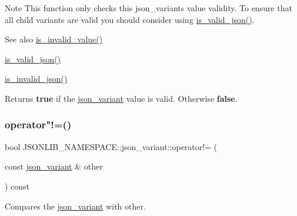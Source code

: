 \begin{DoxyNote}{Note}
This function only checks this json\+\_\+variants value validity. To ensure that all child variants are valid you should consider using \hyperlink{classJSONLIB__NAMESPACE_1_1json__variant_a158e3148d9256af3d1b8251b2ca7b6c4}{is\+\_\+valid\+\_\+json()}. 
\end{DoxyNote}
\begin{DoxySeeAlso}{See also}
\hyperlink{classJSONLIB__NAMESPACE_1_1json__variant_ab6552a5e3de90ab1fbca078e5c245bfb}{is\+\_\+invalid\+\_\+value()} 

\hyperlink{classJSONLIB__NAMESPACE_1_1json__variant_a158e3148d9256af3d1b8251b2ca7b6c4}{is\+\_\+valid\+\_\+json()} 

\hyperlink{classJSONLIB__NAMESPACE_1_1json__variant_a1a08b35da4cf3a334d32ebb81b20c08a}{is\+\_\+invalid\+\_\+json()} 
\end{DoxySeeAlso}
\begin{DoxyReturn}{Returns}
{\bfseries true} if the \hyperlink{classJSONLIB__NAMESPACE_1_1json__variant}{json\+\_\+variant} value is valid. Otherwise {\bfseries false}. 
\end{DoxyReturn}
\mbox{\label{classJSONLIB__NAMESPACE_1_1json__variant_a7672a255983f3142523b3680e737d021}} 
\subsubsection{\texorpdfstring{operator"!=()}{operator!=()}}
{\footnotesize\ttfamily bool J\+S\+O\+N\+L\+I\+B\+\_\+\+N\+A\+M\+E\+S\+P\+A\+C\+E\+::json\+\_\+variant\+::operator!= (\begin{DoxyParamCaption}\item[{const \hyperlink{classJSONLIB__NAMESPACE_1_1json__variant}{json\+\_\+variant} \&}]{other }\end{DoxyParamCaption}) const\hspace{0.3cm}{\ttfamily [inline]}}



Compares the \hyperlink{classJSONLIB__NAMESPACE_1_1json__variant}{json\+\_\+variant} with {\ttfamily other}. 


